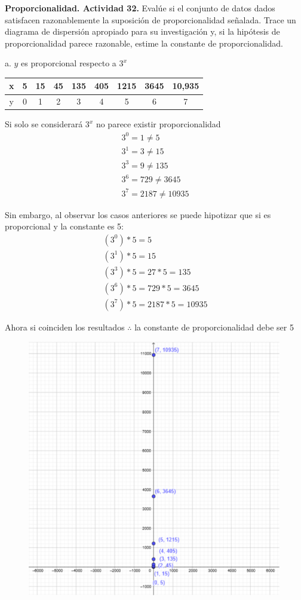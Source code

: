 \documentclass[12pt, letterpaper]{article}
\begin{document}
\newpage

\textbf{Proporcionalidad. Actividad 32.}
\hfill \break
Evalúe si el conjunto de datos dados satisfacen razonablemente la suposición de proporcionalidad señalada. Trace un diagrama de dispersión apropiado para su investigación y, si la hipótesis de proporcionalidad parece razonable, estime la constante de proporcionalidad.


a. $y$ es proporcional respecto a $3^x$

\begin{tabular}{c|c|c|c|c|c|c|c|c}
x & 5 & 15 & 45 &135 & 405 & 1215& 3645 & 10,935\\
\hline
y & 0 & 1 & 2 & 3 & 4 & 5 & 6 & 7 
\end{tabular}

Si solo se considerará $3^x$ no parece existir proporcionalidad
\begin{align*}
	3^0 = 1 \neq 5\\
	3^1 = 3 \neq 15\\
	3^3 =9 \neq 135\\
	3^6 = 729 \neq 3645\\
	3^7 = 2187 \neq 10935
\end{align*}

Sin embargo, al observar los casos anteriores se puede hipotizar que si es proporcional y la constante es 5:
\begin{align*}
	(3^0)*5  = 5\\
	(3^1)*5 = 15\\
	(3^3)*5 = 27*5 = 135\\
	(3^6)*5 = 729*5 = 3645\\
	(3^7)*5 = 2187*5 = 10935
\end{align*}

Ahora si coinciden los resultados $\therefore$ la constante de proporcionalidad debe ser 5

\begin{figure}[h]
\centering
\includegraphics[width=30em]{crececuatrosuno}
\end{figure}
 
\end{document}
